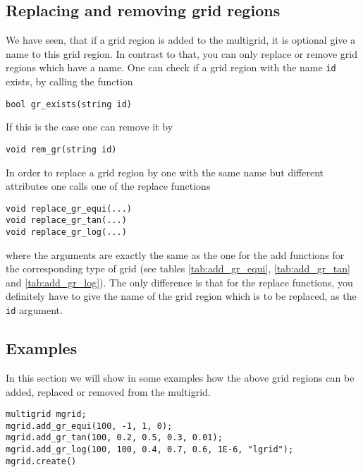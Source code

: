 \subsection{Replacing and removing grid regions}\label{subsec:grid_region_replace_remove}
We have seen, that if a grid region is added to the multigrid, it is optional give a name to this grid region. In contrast to that, you can only replace or remove grid regions which have a name. One can check if a grid region with the name \texttt{id} exists, by calling the function
\begin{lstlisting}
bool gr_exists(string id)
\end{lstlisting}
If this is the case one can remove it by
\begin{lstlisting}
void rem_gr(string id)
\end{lstlisting}
In order to replace a grid region by one with the same name but different attributes one calls one of the replace functions
\begin{lstlisting}
void replace_gr_equi(...)
void replace_gr_tan(...)
void replace_gr_log(...)
\end{lstlisting}
where the arguments are exactly the same as the one for the add functions for the corresponding type of grid (see tables \ref{tab:add_gr_equi}, \ref{tab:add_gr_tan} and \ref{tab:add_gr_log}). The only difference is that for the replace functions, you definitely have to give the name of the grid region which is to be replaced, as the \texttt{id} argument.

\subsection{Examples}\label{subsec:grid_region_examples}

In this section we will show in some examples how the above grid regions can be added, replaced or removed from the multigrid. 

\begin{lstlisting}[caption={Example for the adding of equidistant grid regions},label={lst:add_gr_equi}]
multigrid mgrid;
mgrid.add_gr_equi(100, -1, 1, 0);
mgrid.add_gr_tan(100, 0.2, 0.5, 0.3, 0.01);
mgrid.add_gr_log(100, 100, 0.4, 0.7, 0.6, 1E-6, "lgrid");
mgrid.create()
\end{lstlisting}

